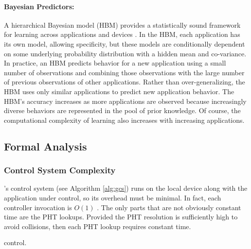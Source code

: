 \paragraph{ Bayesian Predictors:} A hierarchical Bayesian model (HBM)
provides a statistically sound framework for learning across
applications and devices \cite{LEO}.  In the HBM, each application has
its own model, allowing specificity, but these models are
conditionally dependent on some underlying probability distribution
with a hidden mean and co-variance.  In practice, an HBM predicts
behavior for a new application using a small number of observations
and combining those observations with the large number of previous
observations of other applications.  Rather than over-generalizing,
the HBM uses only similar applications to predict new application
behavior.  The HBM's accuracy increases as more applications are
observed because increasingly diverse behaviors are represented in the
pool of prior knowledge.  Of course, the computational complexity of
learning also increases with increasing applications.


\subsection{Formal Analysis}
\subsubsection{Control System Complexity}

\SYSTEM{}'s control system (see Algorithm \ref{alg:gcs}) runs on the
local device along with the application under control, so its overhead
must be minimal.  In fact, each controller invocation is $O(1)$ .  The
only parts that are not obviously constant time are the PHT lookups.
Provided the PHT resolution is sufficiently high to avoid collisions,
then each PHT lookup requires constant time.
\begin{algorithm}[t]
\caption{\SYSTEM{} control.}
\label{alg:gcs}
\end{algorithm}

